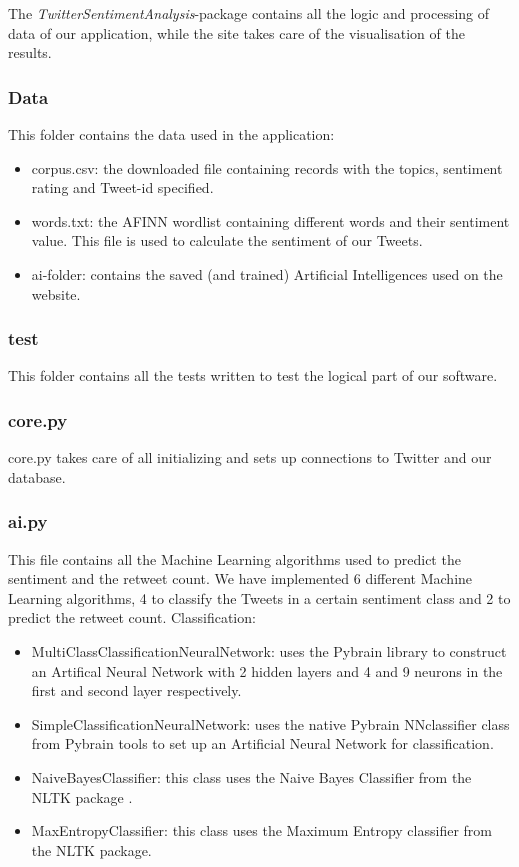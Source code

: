 \documentclass[10pt]{IEEEtran}
\begin{document}
The \emph{TwitterSentimentAnalysis}-package contains all the logic and processing of data of our application, while the site takes care of the visualisation of the results.

\subsubsection{Data}

This folder contains the data used in the application: 
\begin{itemize}
	\item corpus.csv: the downloaded file containing records with the topics, sentiment rating and Tweet-id specified.
	\item words.txt: the AFINN wordlist containing different words and their sentiment value. This file is used to calculate the sentiment of our Tweets.
	\item ai-folder: contains the saved (and trained) Artificial Intelligences used on the website.
\end{itemize}

\subsubsection{test}

This folder contains all the tests written to test the logical part of our software.

\subsubsection{core.py}

core.py takes care of all initializing and sets up connections to Twitter and our database.

\subsubsection{ai.py}

This file contains all the Machine Learning algorithms used to predict the sentiment and the retweet count. We have implemented 6 different Machine Learning algorithms, 4 to classify the Tweets in a certain sentiment class and 2 to predict the retweet count.
Classification:
\begin{itemize}
	\item MultiClassClassificationNeuralNetwork: uses the Pybrain library \cite{pybrain} to construct an Artifical Neural Network with 2 hidden layers and 4 and 9 neurons in the first and second layer respectively. 
	\item SimpleClassificationNeuralNetwork: uses the native Pybrain NNclassifier class from Pybrain tools to set up an Artificial Neural Network for classification. 
	\item NaiveBayesClassifier: this class uses the Naive Bayes Classifier from the NLTK package \cite{nltk}. 
	\item MaxEntropyClassifier: this class uses the Maximum Entropy classifier from the NLTK package. 
\end{itemize}
\end{document}
